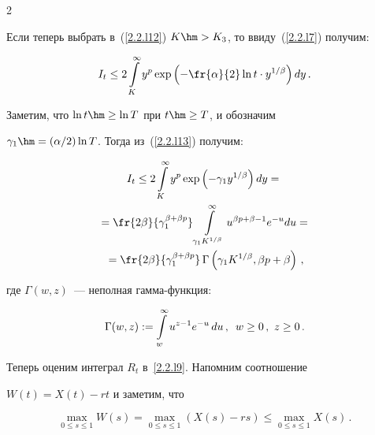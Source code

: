 \begin{multicols}{2}
\begin{equation}
\end{equation}


Если теперь выбрать в~(\ref{2.2.l12}) $K\hm>K_3$, то ввиду~(\ref{2.2.l7}) получим:


\begin{equation}


I_t \leq  2\int\limits_{K}^\infty y^p\exp\left( -\fr{\alpha}{2} \ln t


\cdot y^{1/\beta}\right)dy\,. \label{2.2.l13}


\end{equation}


Заметим, что $\ln t \hm\geq  \ln T$ при $t \hm\geq T$, и обозначим


$\gamma_1\hm=({\alpha}/{2})\ln T$. Тогда  из~(\ref{2.2.l13}) получим:


\begin{multline}


I_t \leq  2\int\limits_{K}^\infty y^p\exp\left( -\gamma_1 y^{1/\beta}\right)dy={}\\


{}= \fr{2\beta}{\gamma_1^{\beta+\beta p}}\int\limits_{\gamma_1


K^{1/\beta}}^\infty u^{\beta p+\beta-1}e^{-u}du={}\\


{}=\fr{2\beta}{\gamma_1^{\beta+\beta p}}\, \Gamma\left(\gamma_1


K^{1/\beta},\beta p+\beta \right)\,,\label{2.2.l10}


\end{multline}


где $\Gamma(w,z)$~--- неполная гам\-ма-функ\-ция:


$$


\Gamma(w,z):=\int\limits_w^\infty u^{z-1}e^{-u}\,du\,, \enskip w\ge 0\,,\ z \geq 0\,.


$$








Теперь оценим интеграл $R_t$ в~\eqref{2.2.l9}. Напомним соотношение


$W(t)=X(t)-rt$ и  заметим, что


\begin{equation}


\max\limits_{0 \leq s \leq 1}W(s)=\max\limits_{0 \leq s \leq 1}( X(s)-rs)


\leq \max\limits_{0 \leq s \leq 1} X(s)\,. \label{asymp1-l11}


\end{equation}



\end{multicols}
